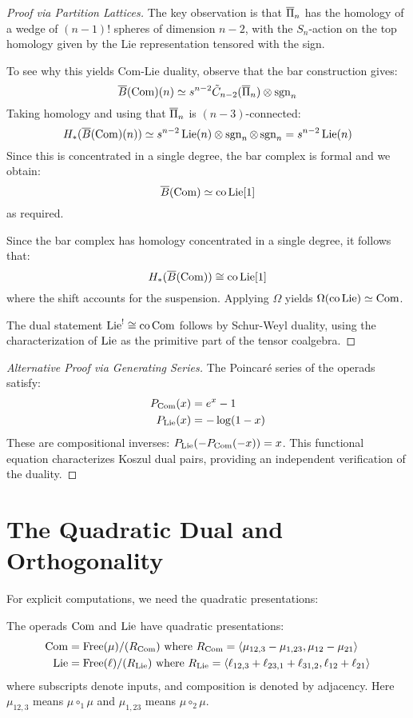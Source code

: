 \begin{example}
\begin{proof}[Proof via Partition Lattices]
The key observation is that $\overline{\Pi}_n$ has the homology of a wedge of $(n-1)!$ spheres of dimension $n-2$, with the $S_n$-action on the top homology given by the Lie representation tensored with the sign.

To see why this yields Com-Lie duality, observe that the bar construction gives:
$$\overline{B}(\operatorname{Com})(n) \simeq s^{n-2}\tilde{C}_{n-2}(\overline{\Pi}_n) \otimes \operatorname{sgn}_n$$
Taking homology and using that $\overline{\Pi}_n$ is $(n-3)$-connected:
$$H_*(\overline{B}(\operatorname{Com})(n)) \simeq s^{n-2}\operatorname{Lie}(n) \otimes \operatorname{sgn}_n \otimes \operatorname{sgn}_n = s^{n-2}\operatorname{Lie}(n)$$
Since this is concentrated in a single degree, the bar complex is formal and we obtain:
$$\overline{B}(\operatorname{Com}) \simeq \text{co}\operatorname{Lie}[1]$$
as required.
 
Since the bar complex has homology concentrated in a single degree, it follows that:
\[
H_*(\overline{B}(\operatorname{Com})) \cong \text{co}\operatorname{Lie}[1]
\]
where the shift accounts for the suspension. Applying $\Omega$ yields $\Omega(\text{co}\operatorname{Lie}) \simeq \operatorname{Com}$.
 
The dual statement $\operatorname{Lie}^! \cong \text{co}\operatorname{Com}$ follows by Schur-Weyl duality, using the characterization of $\operatorname{Lie}$ as the primitive part of the tensor coalgebra.
\end{proof}
 
\begin{proof}[Alternative Proof via Generating Series]
The Poincaré series of the operads satisfy:
\begin{align}
P_{\operatorname{Com}}(x) &= e^x - 1 \\
P_{\operatorname{Lie}}(x) &= -\log(1 - x)
\end{align}
These are compositional inverses: $P_{\operatorname{Lie}}(-P_{\operatorname{Com}}(-x)) = x$. This functional equation characterizes Koszul dual pairs, providing an independent verification of the duality.
\end{proof}
 
\section{The Quadratic Dual and Orthogonality}
 
For explicit computations, we need the quadratic presentations:
 
\begin{proposition}
The operads $\operatorname{Com}$ and $\operatorname{Lie}$ have quadratic presentations:
\begin{align}
\operatorname{Com} &= \operatorname{Free}(\mu)/(R_{\operatorname{Com}}) \text{ where } R_{\operatorname{Com}} = \langle \mu_{12,3} - \mu_{1,23}, \mu_{12} - \mu_{21} \rangle \\
\operatorname{Lie} &= \operatorname{Free}(\ell)/(R_{\operatorname{Lie}}) \text{ where } R_{\operatorname{Lie}} = \langle \ell_{12,3} + \ell_{23,1} + \ell_{31,2}, \ell_{12} + \ell_{21} \rangle
\end{align}
where subscripts denote inputs, and composition is denoted by adjacency. Here $\mu_{12,3}$ means $\mu \circ_1 \mu$ and $\mu_{1,23}$ means $\mu \circ_2 \mu$.
\end{proposition}
 

\end{example}

